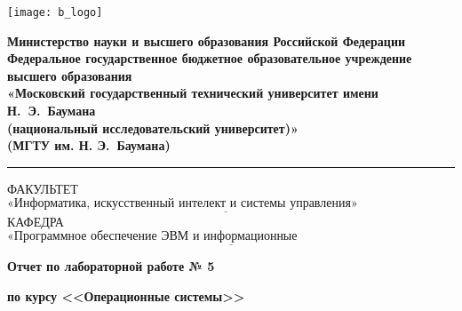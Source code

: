 \begin{titlepage}
	\fontsize{12pt}{12pt}\selectfont
	\noindent \begin{minipage}{0.15\textwidth}
		\texttt{[image: b\_logo]}
	\end{minipage}
	\noindent\begin{minipage}{0.9\textwidth}\centering
		\textbf{Министерство науки и высшего образования Российской Федерации}\\
		\textbf{Федеральное государственное бюджетное образовательное учреждение высшего образования}\\
		\textbf{«Московский государственный технический университет имени Н.~Э.~Баумана}\\
		\textbf{(национальный исследовательский университет)»}\\
		\textbf{(МГТУ им. Н. Э.~Баумана)}
	\end{minipage}

	\noindent\rule{18cm}{3pt}
	\newline\newline
	\noindent ФАКУЛЬТЕТ $\underline{\text{«Информатика, искусственный интелект и системы управления»~~~~~~~~~~~~~~~~~~~~~}}$ \newline\newline
	\noindent КАФЕДРА $\underline{\text{«Программное обеспечение ЭВМ и информационные технологии»~~~~~~~~~~~~~~~~~~~~~~~}}$\newline\newline\newline\newline\newline\newline\newline


	\begin{center}
		\Large\textbf{Отчет по лабораторной работе № 5}
	\end{center}
	\begin{center}
				\Large\textbf{по курсу <<Операционные системы>>}
		
	\end{center}


\end{titlepage}

